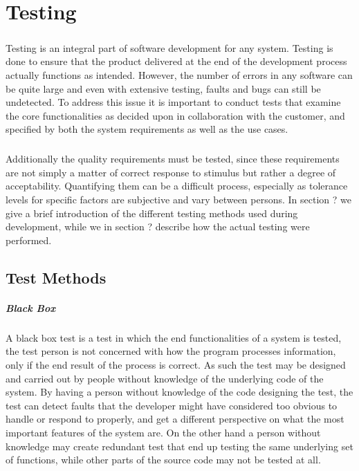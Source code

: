 


\chapter{Testing}
\label{chap:Testing}

\paragraph{} Testing is an integral part of software development for any system. Testing is done to ensure that the product delivered at the end of the development process actually functions as intended. However, the number of errors in any software can be quite large and even with extensive testing, faults and bugs can still be undetected. To address this issue it is important to conduct tests that examine the core functionalities as decided upon in collaboration with the customer, and specified by both the system requirements as well as the use cases.

\paragraph{} Additionally the quality requirements must be tested, since these requirements are not simply a matter of correct response to stimulus but rather a degree of acceptability. Quantifying them can be a difficult process, especially as tolerance levels for specific factors are subjective and vary between persons. \cite{website:software-testing-Jiantao-Pao} In section ? we give a brief introduction of the different testing methods used during development, while we in section ? describe how the actual testing were performed.

\newpage
\section{Test Methods}
\label{sec:TestingMethods}

\paragraph{Black Box} A black box test is a test in which the end functionalities of a system is tested, the test person is not concerned with how the program processes information, only if the end result of the process is correct. As such the test may be designed and carried out by people without knowledge of the underlying code of the system. By having a person without knowledge of the code designing the test, the test can detect faults that the developer might have considered too obvious to handle or respond to properly, and get a different perspective on what the most important features of the system are. On the other hand a person without knowledge may create redundant test that end up testing the same underlying set of functions, while other parts of the source code may not be tested at all. \cite{book:software-testing-Patton}


